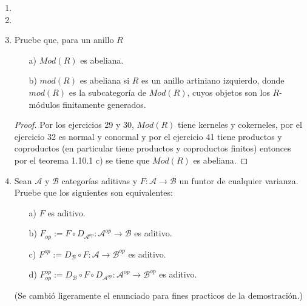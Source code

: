 \documentclass{article}
\begin{document}
\begin{enumerate}[label=\textbf{Ej \arabic*.}]
\begin{proof}
 Es análogo a lo anterior pues $(\mathscr{C}^{op})^{op}=\mathscr{C}$.

\end{proof}

\item
\item

\item Pruebe que, para un anillo $R$
\begin{itemize}
\item[a)] $Mod(R)$ es abeliana.
\item[b)] $mod(R)$ es abeliana si $R$ es un anillo artiniano izquierdo, donde $mod(R)$ es la subcategoría de $Mod(R)$, cuyos objetos son los $R$-módulos
finitamente generados.
\end{itemize}
\begin{proof}
 Por los ejercicios 29 y 30, $Mod(R)$ tiene kerneles y cokerneles, por el ejercicio 32 es normal y conormal y por el ejercicio 41 
tiene productos y coproductos (en particular tiene productos y coproductos finitos) entonces por el teorema 1.10.1 c) se tiene que $Mod(R)$ es abeliana.














\end{proof}


\item Sean $\mathscr{A}$ y $\mathscr{B}$ categorías aditivas y $F:\mathscr{A}\to \mathscr{B}$ un funtor de cualquier varianza. Pruebe que los 
siguientes son equivalentes:
\begin{itemize}
\item[a)] $F$ es aditivo.
\item[b)] $F_{op}:=F\circ D_{\mathscr{A}^{op}}: \mathscr{A}^{op}\longrightarrow \mathscr{B}$ es aditivo.
\item[c)] $F^{op}:=D_{\mathscr{B}}\circ F: \mathscr{A}\longrightarrow \mathscr{B}^{op}$ es aditivo.
\item[d)] $F_{op}^{op}:=D_{\mathscr{B}}\circ F \circ D_{\mathscr{A}^{op}}: \mathscr{A}^{op}\longrightarrow  \mathscr{B}^{op}$ es aditivo.
\end{itemize}
(Se cambió ligeramente el enunciado para fines practicos de la demostración.)


\end{enumerate}
\end{document}
